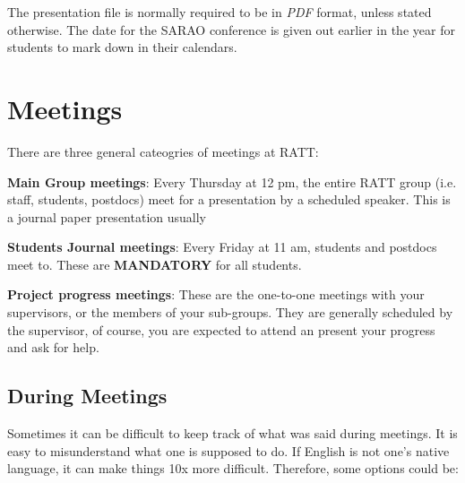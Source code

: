         The presentation file is normally required to be in \emph{PDF} format, unless stated otherwise. The date for the SARAO conference is given out earlier in the year for students to mark down in their calendars.






\section{Meetings}
    There are three general cateogries of meetings at RATT:

    \textbf{Main Group meetings}: Every Thursday at 12 pm, the entire RATT group (i.e. staff, students, postdocs) meet for a presentation by a scheduled speaker. This is a journal paper presentation usually

    \textbf{Students Journal meetings}: Every Friday at 11 am, students and postdocs meet to. These are \textbf{MANDATORY} for all students.

    \textbf{Project progress meetings}: These are the one-to-one meetings with your supervisors, or the members of your sub-groups. They are generally scheduled by the supervisor, of course, you are expected to attend an present your progress and ask for help.

\subsection{During Meetings}
    Sometimes it can be difficult to keep track of what was said during meetings. It is easy to misunderstand what one is supposed to do. If English is not one's native language, it can make things 10x more difficult. Therefore, some options could be:

